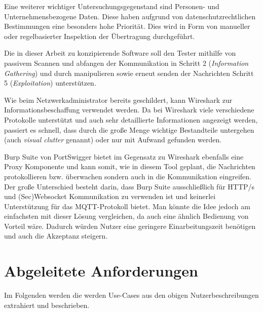     Eine weiterer wichtiger Untersuchungsgegenstand sind Personen- und Unternehmensbezogene Daten. Diese haben aufgrund von datenschutzrechtlichen Bestimmungen eine besonders hohe Priorität. Dies wird in Form von manueller oder regelbasierter Inspektion der Übertragung durchgeführt.
    
    
    Die in dieser Arbeit zu konzipierende Software soll den Tester mithilfe von passivem Scannen und abfangen der Kommunikation in Schritt 2 (\emph{Information Gathering}) und durch manipulieren sowie erneut senden der Nachrichten Schritt 5 (\emph{Exploitation}) unterstützen.
    
    Wie beim Netzwerkadministrator bereits geschildert, kann Wireshark zur Informationsbeschaffung verwendet werden.
    Da bei Wireshark viele verschiedene Protokolle unterstützt und auch sehr detaillierte Informationen angezeigt werden, passiert es schnell, dass durch die große Menge wichtige Bestandteile untergehen (auch \emph{visual clutter} genannt) oder nur mit Aufwand gefunden werden.
    
    Burp Suite von PortSwigger bietet im Gegensatz zu Wireshark ebenfalls eine Proxy Komponente und kann somit, wie in diesem Tool geplant, die Nachrichten protokollieren bzw. überwachen sondern auch in die Kommunikation eingreifen. Der große Unterschied besteht darin, dass Burp Suite ausschließlich für HTTP/s und (Sec)Websocket Kommunikation zu verwenden ist und keinerlei Unterstützung für das \ac{MQTT}-Protokoll bietet. Man könnte die Idee jedoch am einfachsten mit dieser Lösung vergleichen, da auch eine ähnlich Bedienung von Vorteil wäre. Dadurch würden Nutzer eine geringere Einarbeitungszeit benötigen und auch die Akzeptanz steigern.

\section{Abgeleitete Anforderungen}
    Im Folgenden werden die werden Use-Cases aus den obigen Nutzerbeschreibungen extrahiert und beschrieben.
